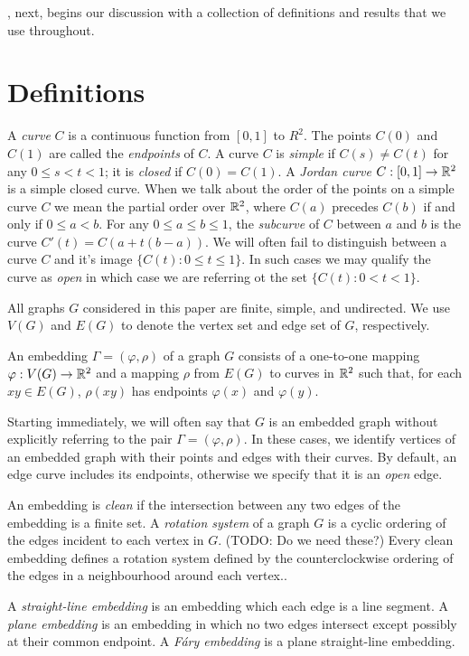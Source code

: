 \documentclass{patmorin}
\begin{document}
, next, begins our discussion with a collection of
definitions and results that we use throughout.


\section{Definitions}


A \emph{curve} $C$ is a continuous function from $[0,1]$ to $R^2$.
The points $C(0)$ and $C(1)$ are called the \emph{endpoints} of $C$.
A curve $C$ is \emph{simple} if $C(s)\neq C(t)$ for any $0\le s<t< 1$; it
is \emph{closed} if $C(0)=C(1)$.  A \emph{Jordan curve} $C:[0,1]\to\mathbb{R}^2$
is a simple closed curve.  When we talk about the order of the points
on a simple curve $C$ we mean the partial order over $\mathbb{R}^2$, where
$C(a)$ precedes $C(b)$ if and only if $0\le a<b$. For any $0\le a\le
b\le 1$, the \emph{subcurve} of $C$ between $a$ and $b$ is the curve
$C'(t)=C(a+t(b-a))$.  We will often fail to distinguish between a
curve $C$ and it's image $\{C(t):0\le t\le 1\}$.  In such cases we may
qualify the curve as \emph{open} in which case we are referring ot the
set $\{C(t):0< t< 1\}$.

All graphs $G$ considered in this paper are finite, simple, and
undirected.   We use $V(G)$ and $E(G)$ to denote the vertex set and
edge set of $G$, respectively.  

An embedding $\Gamma=(\varphi,\rho)$ of a graph $G$ consists
of a one-to-one mapping $\varphi:V(G)\to\mathbb{R}^2$ and a mapping $\rho$ from
$E(G)$ to curves in $\mathbb{R}^2$ such that, for each $xy\in E(G)$, $\rho(xy)$
has endpoints $\varphi(x)$ and $\varphi(y)$.

Starting immediately,  we will often say that $G$ is an embedded graph
without explicitly referring to the pair $\Gamma=(\varphi,\rho)$.
In these cases, we identify vertices of an embedded graph with their
points and edges with their curves. By default, an edge curve includes
its endpoints, otherwise we specify that it is an \emph{open} edge.

An embedding is \emph{clean} if the intersection between any two edges
of the embedding is a finite set.  A \emph{rotation system} of a graph
$G$ is a cyclic ordering of the edges incident to each vertex in $G$.
(TODO: Do we need these?)  Every clean embedding defines a rotation system
defined by the counterclockwise ordering of the edges in a neighbourhood
around each vertex..

A \emph{straight-line embedding} is an embedding which each edge is a
line segment.  A \emph{plane embedding} is an embedding in which no two
edges intersect except possibly at their common endpoint.  A \emph{Fáry
embedding} is a plane straight-line embedding.
\end{document}
